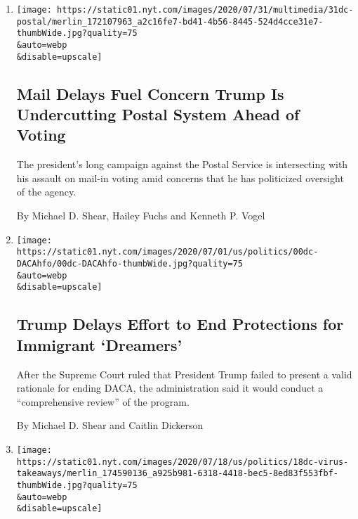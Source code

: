 \begin{enumerate}
\def\labelenumi{\arabic{enumi}.}
\item
  \href{/2020/07/31/us/politics/trump-usps-mail-delays.html}{}

  \texttt{[image: https://static01.nyt.com/images/2020/07/31/multimedia/31dc-postal/merlin\_172107963\_a2c16fe7-bd41-4b56-8445-524d4cce31e7-thumbWide.jpg?quality=75\\\&auto=webp\\\&disable=upscale]}

  \hypertarget{mail-delays-fuel-concern-trump-is-undercutting-postal-system-ahead-of-voting}{%
  \subsection{Mail Delays Fuel Concern Trump Is Undercutting Postal
  System Ahead of
  Voting}\label{mail-delays-fuel-concern-trump-is-undercutting-postal-system-ahead-of-voting}}

  The president's long campaign against the Postal Service is
  intersecting with his assault on mail-in voting amid concerns that he
  has politicized oversight of the agency.

  By Michael D. Shear, Hailey Fuchs and Kenneth P. Vogel
\item
  \href{/2020/07/28/us/politics/trump-daca.html}{}

  \texttt{[image: https://static01.nyt.com/images/2020/07/01/us/politics/00dc-DACAhfo/00dc-DACAhfo-thumbWide.jpg?quality=75\\\&auto=webp\\\&disable=upscale]}

  \hypertarget{trump-delays-effort-to-end-protections-for-immigrant-dreamers}{%
  \subsection{Trump Delays Effort to End Protections for Immigrant
  `Dreamers'}\label{trump-delays-effort-to-end-protections-for-immigrant-dreamers}}

  After the Supreme Court ruled that President Trump failed to present a
  valid rationale for ending DACA, the administration said it would
  conduct a ``comprehensive review'' of the program.

  By Michael D. Shear and Caitlin Dickerson
\item
  \href{/2020/07/18/us/politics/trump-coronavirus-failure-takeaways.html}{}

  \texttt{[image: https://static01.nyt.com/images/2020/07/18/us/politics/18dc-virus-takeaways/merlin\_174590136\_a925b981-6318-4418-bec5-8ed83f553fbf-thumbWide.jpg?quality=75\\\&auto=webp\\\&disable=upscale]}


\end{enumerate}
